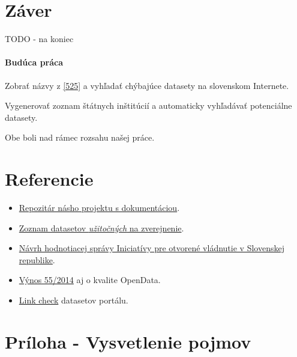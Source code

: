 \documentclass[12pt,a4paper]{article}
\begin{document}

\section{Záver} 

TODO - na koniec 

\paragraph{Budúca práca} 

Zobrať názvy z \ref{525} a vyhľadať chýbajúce datasety na slovenskom Internete. 

Vygenerovať zoznam štátnych inštitúcií a automaticky vyhľadávať potenciálne datasety.

Obe boli nad rámec rozsahu našej práce. 

\section{Referencie} 
\begin{itemize} 
  \item \label{proj} \href{https://github.com/koniiiik/opendata-sk-ias}{Repozitár násho projektu s dokumentáciou}. %
  \item \label{525} \href{http://www.otvorenavlada.gov.sk/datasety-statnej-spravy/}{Zoznam datasetov \emph{užitočných} na zverejnenie}.
  \item \label{hodnotenie} \href{http://www.otvorenavlada.gov.sk/navrh-hodnotiacej-spravy-iniciativy-pre-otvorene-vladnutie-v-slovenskej-republike/}{Návrh hodnotiacej správy Iniciatívy pre otvorené vládnutie v Slovenskej republike}.
  \item \label{kvalita} \href{http://www.zbierka.sk/sk/predpisy/55-2014-z-z.p-35621.pdf}{Výnos 55/2014} aj o kvalite OpenData. 
  \item \label{hany} \href{https://github.com/hanecak/data.gov.sk-link-check/}{Link check} datasetov portálu. 
\end{itemize} 


\section{Príloha - Vysvetlenie pojmov}
\end{document}
